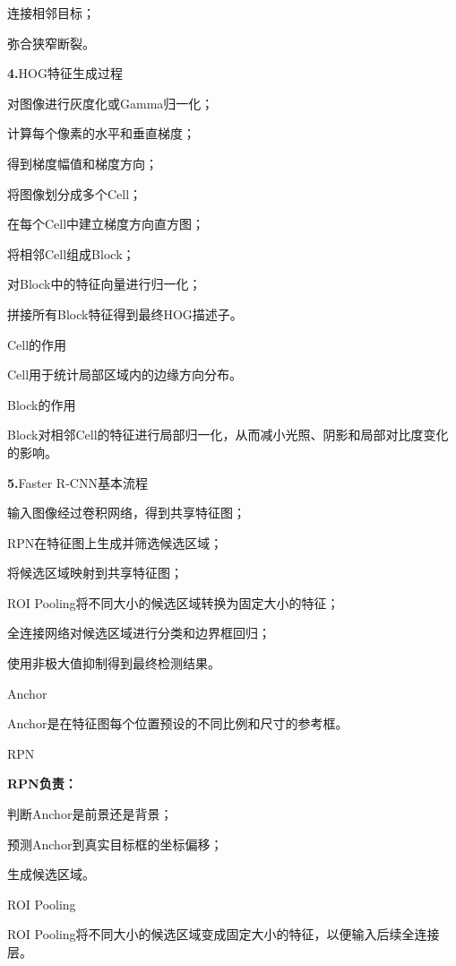 \documentclass[UTF8,openany,oneside,zihao=-4,fontset=windows]{ctexbook}
\newcommand{\Question}[2]{%
  \par\Needspace{4\baselineskip}\medskip
  \noindent\textbf{\color{MVBlue}#1}\quad #2\par
}
\begin{document}
\par\noindent\textbullet\quad 连接相邻目标；
\par 弥合狭窄断裂。
\Question{4.}{HOG特征生成过程}
\par\noindent\textbullet\quad 对图像进行灰度化或Gamma归一化；
\par\noindent\textbullet\quad 计算每个像素的水平和垂直梯度；
\par\noindent\textbullet\quad 得到梯度幅值和梯度方向；
\par\noindent\textbullet\quad 将图像划分成多个Cell；
\par\noindent\textbullet\quad 在每个Cell中建立梯度方向直方图；
\par\noindent\textbullet\quad 将相邻Cell组成Block；
\par\noindent\textbullet\quad 对Block中的特征向量进行归一化；
\par 拼接所有Block特征得到最终HOG描述子。
\par Cell的作用
\par Cell用于统计局部区域内的边缘方向分布。
\par Block的作用
\par Block对相邻Cell的特征进行局部归一化，从而减小光照、阴影和局部对比度变化的影响。
\Question{5.}{Faster R-CNN基本流程}
\par\noindent\textbullet\quad 输入图像经过卷积网络，得到共享特征图；
\par\noindent\textbullet\quad RPN在特征图上生成并筛选候选区域；
\par\noindent\textbullet\quad 将候选区域映射到共享特征图；
\par\noindent\textbullet\quad ROI Pooling将不同大小的候选区域转换为固定大小的特征；
\par\noindent\textbullet\quad 全连接网络对候选区域进行分类和边界框回归；
\par 使用非极大值抑制得到最终检测结果。
\par Anchor
\par Anchor是在特征图每个位置预设的不同比例和尺寸的参考框。
\par RPN
\par\noindent\textbf{RPN负责：}
\par\noindent\textbullet\quad 判断Anchor是前景还是背景；
\par\noindent\textbullet\quad 预测Anchor到真实目标框的坐标偏移；
\par 生成候选区域。
\par ROI Pooling
\par ROI Pooling将不同大小的候选区域变成固定大小的特征，以便输入后续全连接层。
\end{document}

